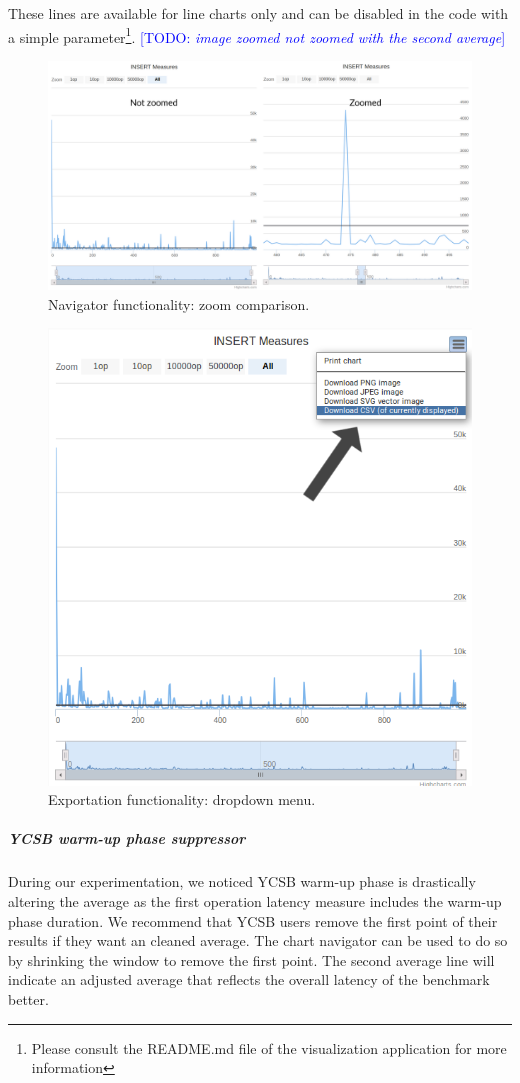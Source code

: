 \documentclass[a4paper,11pt]{report}
\newcommand*{\todo}[1]{\textcolor{blue}{[TODO: \emph{#1}]}}
\begin{document}
These lines are available for line charts only and can be disabled in the code with a simple parameter\footnote{Please consult the README.md file of the visualization application for more information}.  \todo{image zoomed not zoomed with the second average}

\begin{figure}[ht]
\begin{center}
\includegraphics[width=1\linewidth]{images/chart_not_zoomed_zoomed.png}
\caption{Navigator functionality: zoom comparison.}
\label{chart_not_zoomed_zoomed}
\end{center}
\end{figure}

\begin{figure}[ht]
\begin{center}
\includegraphics[width=0.5\linewidth]{images/chart_exportation.png}
\caption{Exportation functionality: dropdown menu.}
\label{chart_exportation}
\end{center}
\end{figure}

\subparagraph{YCSB warm-up phase suppressor}

During our experimentation, we noticed YCSB warm-up phase is drastically altering the average as the first operation latency measure includes the warm-up phase duration. We recommend that YCSB users remove the first point of their results if they want an cleaned average. The chart navigator can be used to do so by shrinking the window to remove the first point. The second average line will indicate an adjusted average that reflects the overall latency of the benchmark better.
\end{document}
